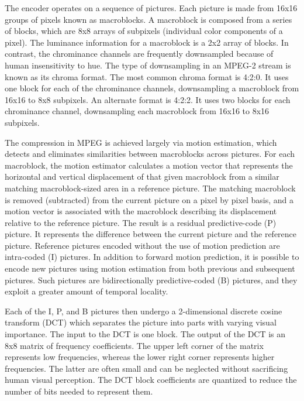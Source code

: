 The encoder operates on a sequence of pictures. Each picture is made
from 16x16 groups of pixels known as macroblocks.  A macroblock is
composed from a series of blocks, which are 8x8 arrays of subpixels
(individual color components of a pixel). The luminance information
for a macroblock is a 2x2 array of blocks. In contrast, the
chrominance channels are frequently downsampled because of human
insensitivity to hue. The type of downsampling in an MPEG-2 stream is
known as its chroma format. The most common chroma format is 4:2:0. It
uses one block for each of the chrominance channels, downsampling a
macroblock from 16x16 to 8x8 subpixels. An alternate format is
4:2:2. It uses two blocks for each chrominance channel, downsampling
each macroblock from 16x16 to 8x16 subpixels.

The compression in MPEG is achieved largely via motion estimation,
which detects and eliminates similarities between macroblocks across
pictures. For each macroblock, the motion estimator calculates a motion
vector that represents the horizontal and vertical displacement of that 
given macroblock from a similar matching
macroblock-sized area in a reference picture.  The matching macroblock
is removed (subtracted) from the current picture on a pixel by pixel
basis, and a motion vector is associated with the macroblock
describing its displacement relative to the reference picture. The
result is a residual predictive-code (P) picture. It represents the
difference between the current picture and the reference
picture. Reference pictures encoded without the use of motion
prediction are intra-coded (I) pictures. In addition to forward motion
prediction, it is possible to encode new pictures using motion
estimation from both previous and subsequent pictures. Such pictures
are bidirectionally predictive-coded (B) pictures, and they exploit a
greater amount of temporal locality.

Each of the I, P, and B pictures then undergo a 2-dimensional
discrete cosine transform (DCT) which separates the picture into parts
with varying visual importance. The input to the DCT is one block.
The output of the
DCT is an 8x8 matrix of frequency coefficients. The upper left corner
of the matrix represents low frequencies, whereas the lower right
corner represents higher frequencies. The latter are often small and
can be neglected without sacrificing human visual perception. The DCT 
block coefficients are quantized to reduce the number of bits needed
to represent them. 

